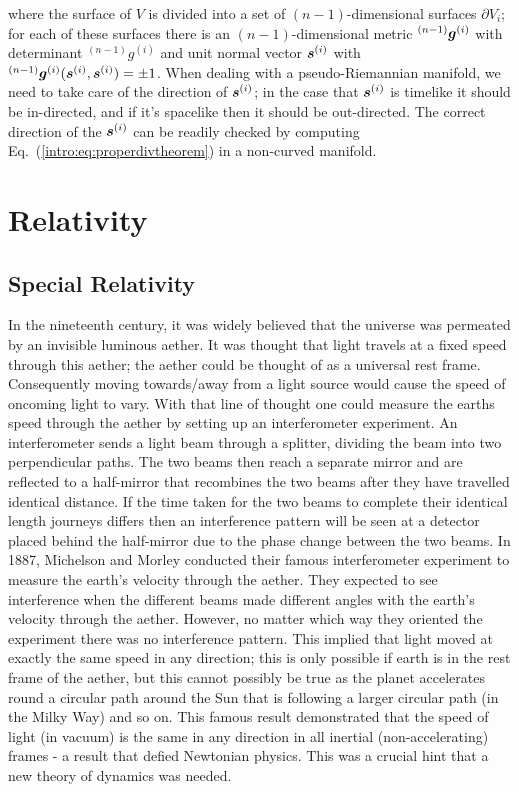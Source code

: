 where the surface of $V$ is divided into a set of $(n-1)$-dimensional surfaces $\partial V_i$; for each of these surfaces there is an $(n-1)$-dimensional metric ${}^{(n-1)}\boldsymbol{g}^{(i)}$ with determinant ${}^{(n-1)} g ^{(i)}$ and unit normal vector $\boldsymbol{s}^{(i)}$ with ${}^{(n-1)}\boldsymbol{g}^{(i)}(\boldsymbol{s}^{(i)},\boldsymbol{s}^{(i)})=\pm 1$. When dealing with a pseudo-Riemannian manifold, we need to take care of the direction of $\boldsymbol{s}^{(i)}$; in the case that $\boldsymbol{s}^{(i)}$ is timelike it should be in-directed, and if it's spacelike then it should be out-directed. The correct direction of the $\boldsymbol{s}^{(i)}$ can be readily checked by computing Eq.~(\ref{intro:eq:properdivtheorem}) in a non-curved manifold.












\newpage
\section{Relativity}


\subsection{Special Relativity}

In the nineteenth century, it was widely believed that the universe was permeated by an invisible luminous aether. It was thought that light travels at a fixed speed through this aether; the aether could be thought of as a universal rest frame. Consequently moving towards/away from a light source would cause the speed of oncoming light to vary. With that line of thought one could measure the earths speed through the aether by setting up an interferometer experiment. An interferometer sends a light beam through a splitter, dividing the beam into two perpendicular paths. The two beams then reach a separate mirror and are reflected to a half-mirror that recombines the two beams after they have travelled identical distance. If the time taken for the two beams to complete their identical length journeys differs then an interference pattern will be seen at a detector placed behind the half-mirror due to the phase change between the two beams. In 1887, Michelson and Morley conducted their famous interferometer experiment to measure the earth's velocity through the aether. They expected to see interference when the different beams made different angles with the earth's velocity through the aether. However, no matter which way they oriented the experiment there was no interference pattern. This implied that light moved at exactly the same speed in any direction; this is only possible if earth is in the rest frame of the aether, but this cannot possibly be true as the planet accelerates round a circular path around the Sun that is following a larger circular path (in the Milky Way) and so on. This famous result demonstrated that the speed of light (in vacuum) is the same in any direction in all inertial (non-accelerating) frames - a result that defied Newtonian physics. This was a crucial hint that a new theory of dynamics was needed.

